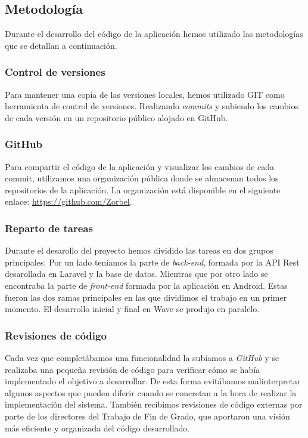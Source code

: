 \subsection{Metodología}

Durante el desarrollo del código de la aplicación hemos utilizado las metodologías que se detallan a continuación.

\subsubsection{Control de versiones}

Para mantener una copia de las versiones locales, hemos utilizado GIT como herramienta de control de versiones. Realizando \textit{commits} y subiendo los cambios de cada versión en un repositorio público alojado en GitHub.

\subsubsection{GitHub}

Para compartir el código de la aplicación y visualizar los cambios de cada commit, utilizamos una organización pública donde se almacenan todos los repositorios de la aplicación. La organización está disponible en el siguiente enlace: \url{https://github.com/Zorbel}.

\subsubsection{Reparto de tareas}

Durante el desarollo del proyecto hemos dividido las tareas en dos grupos principales. Por un lado teníamos la parte de \textit{back-end}, formada por la API Rest desarollada en Laravel y la base de datos. Mientras que por otro lado se encontraba la parte de \textit{front-end} formada por la aplicación en Android. Estas fueron las dos ramas principales en las que dividimos el trabajo en un primer momento. El desarrollo inicial y final en Wave se produjo en paralelo.

\subsubsection{Revisiones de código}

Cada vez que completábamos una funcionalidad la subíamos a \textit{GitHub} y se realizaba una pequeña revisión de código para verificar cómo se había implementado el objetivo a desarrollar. De esta forma evitábamos malinterpretar algunos aspectos que pueden diferir cuando se concretan a la hora de realizar la implementación del sistema. También recibimos revisiones de código externas por parte de los directores del Trabajo de Fin de Grado, que aportaron una visión más eficiente y organizada del código desarrollado.

